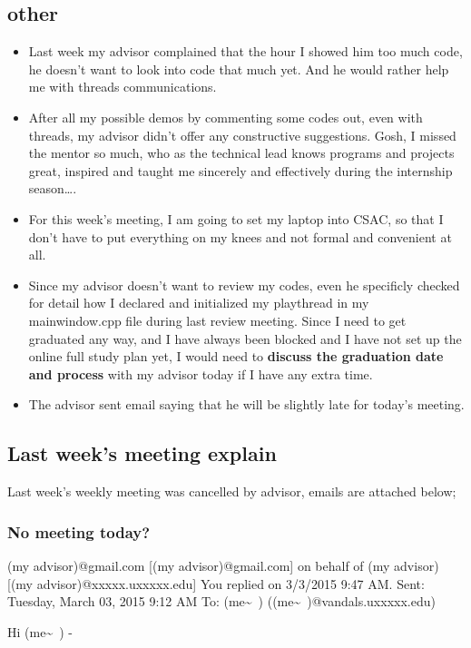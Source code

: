 \documentclass[9pt,b5paper]{article}
\begin{document}
\subsection{other}
\label{sec-2-2}
\begin{itemize}
\item Last week my advisor complained that the hour I showed him too much code, he doesn't want to look into code that much yet. And he would rather help me with threads communications.
\item After all my possible demos by commenting some codes out, even with threads, my advisor didn't offer any constructive suggestions. Gosh, I missed the mentor so much, who as the technical lead knows programs and projects great, inspired and taught me sincerely and effectively during the internship season\ldots{}.
\item For this week's meeting, I am going to set my laptop into CSAC, so that I don't have to put everything on my knees and not formal and convenient at all.
\item Since my advisor doesn't want to review my codes, even he specificly checked for detail how I declared and initialized my playthread in my mainwindow.cpp file during last review meeting. Since I need to get graduated any way, and I have always been blocked and I have not set up the online full study plan yet, I would need to \textbf{discuss the graduation date and process} with my advisor today if I have any extra time.
\item The advisor sent email saying that he will be slightly late for today's meeting.
\end{itemize}
\subsection{Last week's meeting explain}
\label{sec-2-3}
Last week's weekly meeting was cancelled by advisor, emails are attached below;

\subsubsection{No meeting today?}
\label{sec-2-3-1}
(my advisor)@gmail.com [(my advisor)@gmail.com] on behalf of (my advisor) [(my advisor)@xxxxx.uxxxxx.edu]
You replied on 3/3/2015 9:47 AM.
Sent:        Tuesday, March 03, 2015 9:12 AM
To:        (me\textasciitilde{}~) ((me\textasciitilde{}~)@vandals.uxxxxx.edu)

Hi (me\textasciitilde{}~) - 
\end{document}
